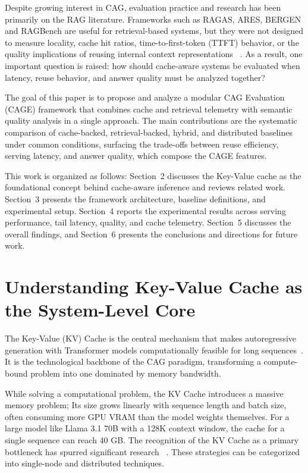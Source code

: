 \documentclass[12pt,a4paper]{article}
\let\cite\citep
\begin{document}
Despite growing interest in CAG, evaluation practice and research has been primarily on the RAG literature. Frameworks such as RAGAS, ARES, BERGEN and RAGBench are useful for retrieval-based systems, but they were not designed to measure locality, cache hit ratios, time-to-first-token (TTFT) behavior, or the quality implications of reusing internal context representations ~\cite{espejel2023ragas, li2024ragbench,ares2024,bergen2024}. As a result, one important question is raised: how should cache-aware systems be evaluated when latency, reuse behavior, and answer quality must be analyzed together?  

The goal of this paper is to propose and analyze a modular CAG Evaluation (CAGE) framework that combines cache and retrieval telemetry with semantic quality analysis in a single approach. The main contributions are the systematic comparison of cache-backed, retrieval-backed, hybrid, and distributed baselines under common conditions, surfacing the trade-offs between reuse efficiency, serving latency, and answer quality, which compose the CAGE features.

This work is organized as follows: Section~2 discusses the Key-Value cache as the foundational concept behind cache-aware inference and reviews related work. Section~3 presents the framework architecture, baseline definitions, and experimental setup. Section~4 reports the experimental results across serving performance, tail latency, quality, and cache telemetry. Section~5 discusses the overall findings, and Section~6 presents the conclusions and directions for future work.

\section{Understanding Key-Value Cache as the System-Level Core}

The Key-Value (KV) Cache is the central mechanism that makes autoregressive generation with Transformer models computationally feasible for long sequences~\cite{kwon2023efficient}. It is the technological backbone of the CAG paradigm, transforming a compute-bound problem into one dominated by memory bandwidth.

While solving a computational problem, the KV Cache introduces a massive memory problem; Its size grows linearly with sequence length and batch size, often consuming more GPU VRAM than the model weights themselves. For a large model like Llama 3.1 70B with a 128K context window, the cache for a single sequence can reach 40 GB. The recognition of the KV Cache as a primary bottleneck has spurred significant research ~\cite{li2024kvsurvey}. These strategies can be categorized into single-node and distributed techniques.
\end{document}
